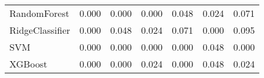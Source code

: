 \begin{tabular}{lllllll}
                   RandomForest & 0.000 &                     0.000 &                 0.000 &                  0.048 &                                   0.024 &     0.071 \\
                RidgeClassifier & 0.000 &                     0.048 &                 0.024 &                  0.071 &                                   0.000 &     0.095 \\
                            SVM & 0.000 &                     0.000 &                 0.000 &                  0.000 &                                   0.048 &     0.000 \\
                        XGBoost & 0.000 &                     0.000 &                 0.024 &                  0.000 &                                   0.048 &     0.024 \\
\bottomrule
\end{tabular}
